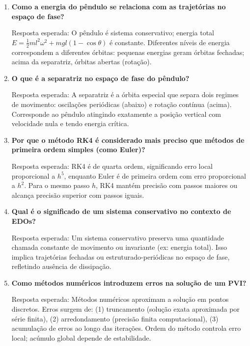 \documentclass[12pt,a4paper]{article}
\begin{document}
\begin{enumerate}
    \item \textbf{Como a energia do pêndulo se relaciona com as trajetórias no espaço de fase?} \par
    Resposta esperada: O pêndulo é sistema conservativo; energia total $E = \frac{1}{2}ml^2\omega^2 + mgl(1-\cos\theta)$ é constante. Diferentes níveis de energia correspondem a diferentes órbitas: pequenas energias geram órbitas fechadas; acima da separatriz, órbitas abertas (rotação).
    
    \item \textbf{O que é a separatriz no espaço de fase do pêndulo?} \par
    Resposta esperada: A separatriz é a órbita especial que separa dois regimes de movimento: oscilações periódicas (abaixo) e rotação contínua (acima). Corresponde ao pêndulo atingindo exatamente a posição vertical com velocidade nula e tendo energia crítica.
    
    \item \textbf{Por que o método RK4 é considerado mais preciso que métodos de primeira ordem simples (como Euler)?} \par
    Resposta esperada: RK4 é de quarta ordem, significando erro local proporcional a $h^5$, enquanto Euler é de primeira ordem com erro proporcional a $h^2$. Para o mesmo passo $h$, RK4 mantém precisão com passos maiores ou alcança precisão superior com passos iguais.
    
    \item \textbf{Qual é o significado de um sistema conservativo no contexto de EDOs?} \par
    Resposta esperada: Um sistema conservativo preserva uma quantidade chamada constante de movimento ou invariante (ex: energia total). Isso implica trajetórias fechadas ou estruturado-periódicas no espaço de fase, refletindo ausência de dissipação.
    
    \item \textbf{Como métodos numéricos introduzem erros na solução de um PVI?} \par
    Resposta esperada: Métodos numéricos aproximam a solução em pontos discretos. Erros surgem de: (1) truncamento (solução exata aproximada por série finita), (2) arredondamento (precisão finita computacional), (3) acumulação de erros ao longo das iterações. Ordem do método controla erro local; acúmulo global depende de estabilidade.

\end{enumerate}
\end{document}
